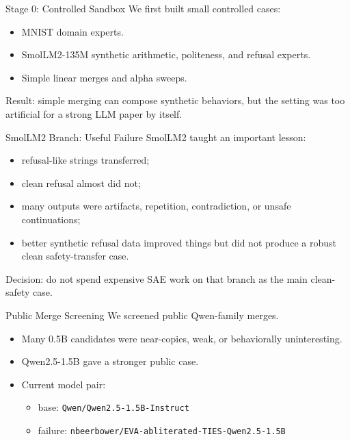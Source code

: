 \documentclass[aspectratio=169]{beamer}
\begin{document}
\begin{frame}{Stage 0: Controlled Sandbox}
  We first built small controlled cases:
  \begin{itemize}
    \item MNIST domain experts.
    \item SmolLM2-135M synthetic arithmetic, politeness, and refusal experts.
    \item Simple linear merges and alpha sweeps.
  \end{itemize}

  \vspace{0.3cm}
  Result: simple merging can compose synthetic behaviors, but the setting was too artificial for a strong LLM paper by itself.
\end{frame}

\begin{frame}{SmolLM2 Branch: Useful Failure}
  SmolLM2 taught an important lesson:
  \begin{itemize}
    \item refusal-like strings transferred;
    \item clean refusal almost did not;
    \item many outputs were artifacts, repetition, contradiction, or unsafe continuations;
    \item better synthetic refusal data improved things but did not produce a robust clean safety-transfer case.
  \end{itemize}

  \vspace{0.25cm}
  Decision: do not spend expensive SAE work on that branch as the main clean-safety case.
\end{frame}

\begin{frame}{Public Merge Screening}
  We screened public Qwen-family merges.

  \begin{itemize}
    \item Many 0.5B candidates were near-copies, weak, or behaviorally uninteresting.
    \item Qwen2.5-1.5B gave a stronger public case.
    \item Current model pair:
      \begin{itemize}
        \item base: \texttt{Qwen/Qwen2.5-1.5B-Instruct}
        \item failure: \texttt{nbeerbower/EVA-abliterated-TIES-Qwen2.5-1.5B}
      \end{itemize}
  \end{itemize}
\end{frame}
\end{document}
